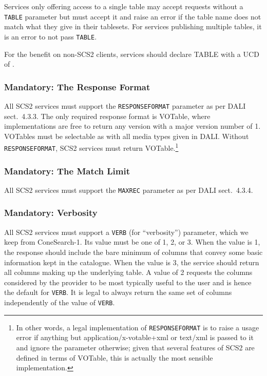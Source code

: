 \documentclass[11pt,a4paper]{ivoa}
\begin{document}
Services only offering access to a single table may accept requests without a
\verb|TABLE| parameter but must accept it and raise an error if the table name
does not match what they give in their tablesets.  For services
publishing multiple tables, it is an error to not pass \verb|TABLE|.

For the benefit on non-SCS2 clients, services should declare TABLE with
a UCD of .

\subsubsection{Mandatory: The Response Format}

All SCS2 services must support the \verb|RESPONSEFORMAT| parameter as
per DALI sect.~4.3.3.  The only required response format is VOTable,
where implementations are free to return any version with a major
version number of 1.  VOTables must be selectable as with all media
types given in DALI.  Without \verb|RESPONSEFORMAT|, SCS2 services must return
VOTable.\footnote{In other words, a legal
implementation of \texttt{RESPONSEFORMAT} is to raise a usage error if anything but
application/x-votable+xml or text/xml is passed to it and ignore the
parameter otherwise; given that several features of SCS2 are defined in
terms of VOTable, this is actually the most sensible implementation.}

\subsubsection{Mandatory: The Match Limit}

All SCS2 services must support the \verb|MAXREC| parameter as per DALI
sect.~4.3.4.

\subsubsection{Mandatory: Verbosity}

All SCS2 services must support a \verb|VERB| (for ``verbosity'')
parameter, which we keep from ConeSearch-1.  Its value must be one of 1, 2, or
3.  When the value is 1, the response should include the bare minimum of
columns that convey some basic information kept in the catalogue.  When
the value is 3, the service should return all columns making up the
underlying table.  A value of 2 requests the columns considered by the
provider to be most typically useful to the user and is hence the
default for \verb|VERB|.   It is legal to
always return the same set of columns independently of the value of
\verb|VERB|.
\end{document}

